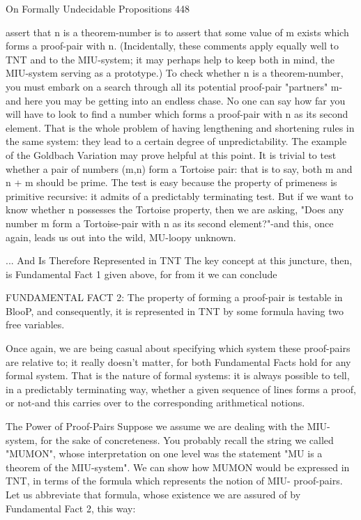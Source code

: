 On Formally Undecidable Propositions                                                       448

assert that n is a theorem-number is to assert that some value of m exists which forms a
proof-pair with n. (Incidentally, these comments apply equally well to TNT and to the
MIU-system; it may perhaps help to keep both in mind, the MIU-system serving as a
prototype.) To check whether n is a theorem-number, you must embark on a search
through all its potential proof-pair "partners" m-and here you may be getting into an
endless chase. No one can say how far you will have to look to find a number which
forms a proof-pair with n as its second element. That is the whole problem of having
lengthening and shortening rules in the same system: they lead to a certain degree of
unpredictability.
         The example of the Goldbach Variation may prove helpful at this point. It is
trivial to test whether a pair of numbers (m,n) form a Tortoise pair: that is to say, both m
and n + m should be prime. The test is easy because the property of primeness is
primitive recursive: it admits of a predictably terminating test. But if we want to know
whether n possesses the Tortoise property, then we are asking, "Does any number m form
a Tortoise-pair with n as its second element?"-and this, once again, leads us out into the
wild, MU-loopy unknown.

                    ... And Is Therefore Represented in TNT
The key concept at this juncture, then, is Fundamental Fact 1 given above, for from it we
can conclude

   FUNDAMENTAL FACT 2: The property of forming a proof-pair is testable in
   BlooP, and consequently, it is represented in TNT by some formula having two
   free variables.

        Once again, we are being casual about specifying which system these proof-pairs
are relative to; it really doesn't matter, for both Fundamental Facts hold for any formal
system. That is the nature of formal systems: it is always possible to tell, in a predictably
terminating way, whether a given sequence of lines forms a proof, or not-and this carries
over to the corresponding arithmetical notions.

                              The Power of Proof-Pairs
Suppose we assume we are dealing with the MIU-system, for the sake of concreteness.
You probably recall the string we called "MUMON", whose interpretation on one level
was the statement "MU is a theorem of the MIU-system". We can show how MUMON
would be expressed in TNT, in terms of the formula which represents the notion of MIU-
proof-pairs. Let us abbreviate that formula, whose existence we are assured of by
Fundamental Fact 2, this way:

